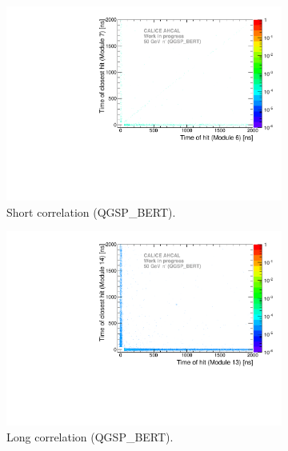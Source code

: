 \begin{figure}[htbp!]
\begin{subfigure}[t]{0.5\textwidth}
		\centering
		\includegraphics[width=1\textwidth]{../Thesis_Plots/Timing/Pions/Plots/ComparisonToSim/Time_Correlation_50GeV_short_QGSPBERT.pdf}
		\caption{Short correlation (QGSP\_BERT).}\label{fig:Corr_short_QGSPBERT}
	\end{subfigure}
	\hfill
	\begin{subfigure}[t]{0.5\textwidth}
		\centering
		\includegraphics[width=1\textwidth]{../Thesis_Plots/Timing/Pions/Plots/ComparisonToSim/Time_Correlation_50GeV_long_QGSPBERT.pdf}
		\caption{Long correlation (QGSP\_BERT).} \label{fig:Corr_long_QGSPBERT}
	\end{subfigure}
	\hfill
	\begin{subfigure}[t]{0.5\textwidth}
		\centering

\end{subfigure}
\end{figure}
